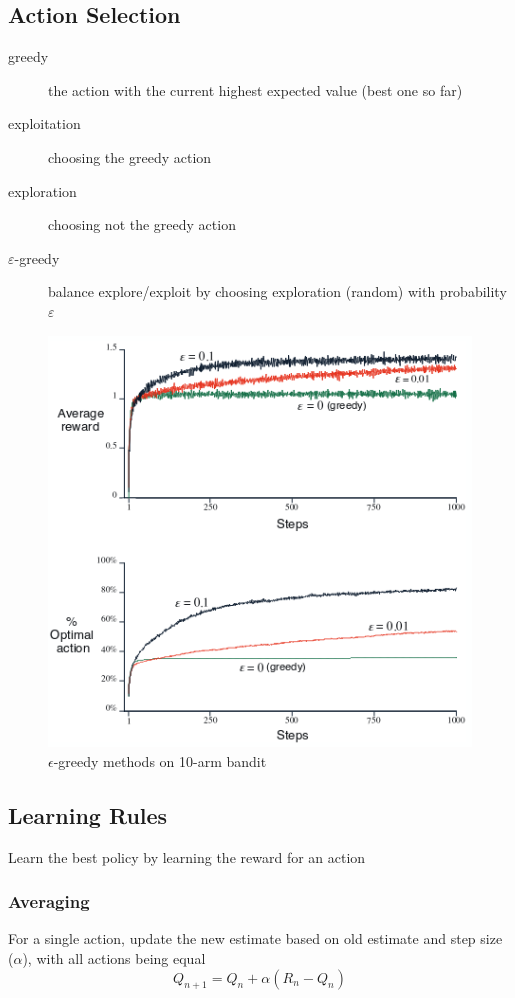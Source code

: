 \documentclass[]{article}
\theoremstyle{definition}
\begin{document}
\subsection{Action Selection}
\begin{description}
    \item[greedy] the action with the current highest expected value (best one so far)
    \item[exploitation] choosing the greedy action
    \item[exploration] choosing not the greedy action
    \item[$\varepsilon$-greedy] balance explore/exploit by choosing exploration (random) with probability $\varepsilon$
\end{description}
\begin{figure}[ht]
    \centering
    \includegraphics[width=0.5\linewidth]{epsilon_10arm.png}
    \caption{$\epsilon$-greedy methods on 10-arm bandit}
    \label{fig:}
\end{figure}

\subsection{Learning Rules}
\label{sub:learning_rules}

Learn the best policy by learning the reward for an action

\subsubsection{Averaging}
\label{ssub:averaging}

For a single action, update the new estimate based on old estimate and step size ($\alpha$), with all actions being equal
\begin{equation*}
    Q_{n+1} = Q_n + \alpha (R_n - Q_n)
\end{equation*}
\end{document}
